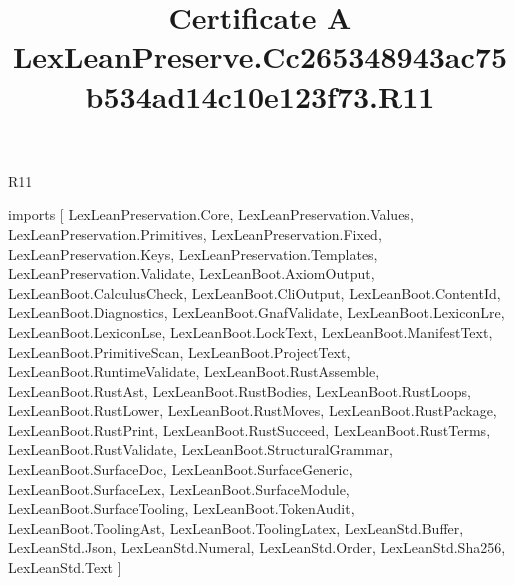 \begin{lexlean}{R11}
\title{Certificate A LexLeanPreserve.Cc265348943ac75b534ad14c10e123f73.R11}
\begin{coremodule}
imports [
  LexLeanPreservation.Core,
  LexLeanPreservation.Values,
  LexLeanPreservation.Primitives,
  LexLeanPreservation.Fixed,
  LexLeanPreservation.Keys,
  LexLeanPreservation.Templates,
  LexLeanPreservation.Validate,
  LexLeanBoot.AxiomOutput,
  LexLeanBoot.CalculusCheck,
  LexLeanBoot.CliOutput,
  LexLeanBoot.ContentId,
  LexLeanBoot.Diagnostics,
  LexLeanBoot.GnafValidate,
  LexLeanBoot.LexiconLre,
  LexLeanBoot.LexiconLse,
  LexLeanBoot.LockText,
  LexLeanBoot.ManifestText,
  LexLeanBoot.PrimitiveScan,
  LexLeanBoot.ProjectText,
  LexLeanBoot.RuntimeValidate,
  LexLeanBoot.RustAssemble,
  LexLeanBoot.RustAst,
  LexLeanBoot.RustBodies,
  LexLeanBoot.RustLoops,
  LexLeanBoot.RustLower,
  LexLeanBoot.RustMoves,
  LexLeanBoot.RustPackage,
  LexLeanBoot.RustPrint,
  LexLeanBoot.RustSucceed,
  LexLeanBoot.RustTerms,
  LexLeanBoot.RustValidate,
  LexLeanBoot.StructuralGrammar,
  LexLeanBoot.SurfaceDoc,
  LexLeanBoot.SurfaceGeneric,
  LexLeanBoot.SurfaceLex,
  LexLeanBoot.SurfaceModule,
  LexLeanBoot.SurfaceTooling,
  LexLeanBoot.TokenAudit,
  LexLeanBoot.ToolingAst,
  LexLeanBoot.ToolingLatex,
  LexLeanStd.Buffer,
  LexLeanStd.Json,
  LexLeanStd.Numeral,
  LexLeanStd.Order,
  LexLeanStd.Sha256,
  LexLeanStd.Text
]


\end{coremodule}
\end{lexlean}
